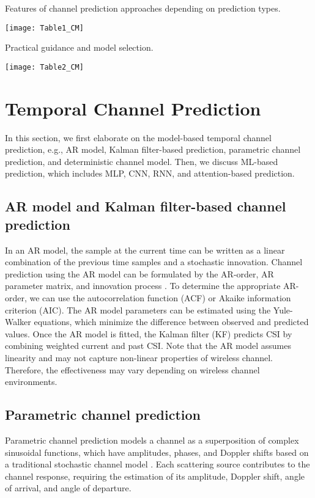 \documentclass[lettersize,journal]{IEEEtran}
\begin{document}
\begin{table*}[t]
	\centering
	\caption{Features of channel prediction approaches depending on prediction types.}
	\texttt{[image: Table1\_CM]}
	\label{table1}
\end{table*}

\begin{table*}[t]
	\centering
	\caption{Practical guidance and model selection.}
	\texttt{[image: Table2\_CM]}
	\label{table2}
\end{table*}

\section{Temporal Channel Prediction}\label{Section3}
In this section, we first elaborate on the model-based temporal channel prediction, e.g., AR model, Kalman filter-based prediction, parametric channel prediction, and deterministic channel model. Then, we discuss ML-based prediction, which includes MLP, CNN, RNN, and attention-based prediction. %

\subsection{AR model and Kalman filter-based channel prediction}
In an AR model, the sample at the current time can be written as a linear combination of the previous time samples and a stochastic innovation. Channel prediction using the AR model can be formulated by the AR-order, AR parameter matrix, and innovation process \cite{Shikur15}. To determine the appropriate AR-order, we can use the autocorrelation function (ACF) or Akaike information criterion (AIC). 
The AR model parameters can be estimated using the Yule-Walker equations, which minimize the difference between observed and predicted values. Once the AR model is fitted, the Kalman filter (KF) predicts CSI by combining weighted current and past CSI. Note that the AR model assumes linearity and may not capture non-linear properties of wireless channel. Therefore, the effectiveness may vary depending on wireless channel environments.

\subsection{Parametric channel prediction}
Parametric channel prediction models a channel as a superposition of complex sinusoidal functions, which have amplitudes, phases, and Doppler shifts based on a traditional stochastic channel model \cite{Adeogun13}. %
Each scattering source contributes to the channel response, requiring the estimation of its amplitude, Doppler shift, angle of arrival, and angle of departure.
\end{document}
